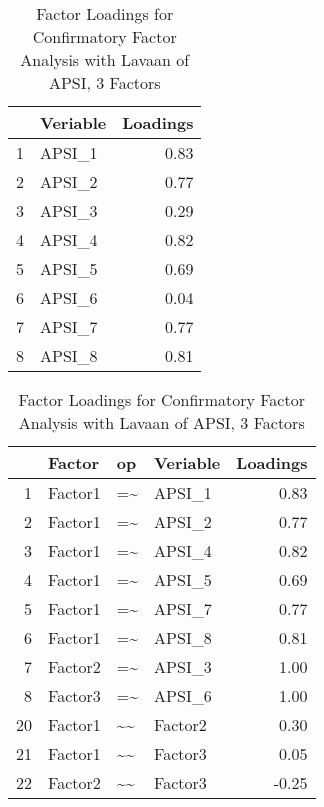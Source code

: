 \documentclass{article}\usepackage[]{graphicx}\usepackage[]{color}
\begin{document}
\begin{table}[ht]
\centering
\begin{tabular}{rlr}
  \hline
 & Veriable & Loadings \\ 
  \hline
1 & APSI\_1 & 0.83 \\ 
  2 & APSI\_2 & 0.77 \\ 
  3 & APSI\_3 & 0.29 \\ 
  4 & APSI\_4 & 0.82 \\ 
  5 & APSI\_5 & 0.69 \\ 
  6 & APSI\_6 & 0.04 \\ 
  7 & APSI\_7 & 0.77 \\ 
  8 & APSI\_8 & 0.81 \\ 
   \hline
\end{tabular}
\caption{Factor Loadings for Confirmatory Factor Analysis with Lavaan of APSI, 3 Factors} 
\end{table}
\begin{table}[ht]
\centering
\begin{tabular}{rlllr}
  \hline
 & Factor & op & Veriable & Loadings \\ 
  \hline
1 & Factor1 & =\~{} & APSI\_1 & 0.83 \\ 
  2 & Factor1 & =\~{} & APSI\_2 & 0.77 \\ 
  3 & Factor1 & =\~{} & APSI\_4 & 0.82 \\ 
  4 & Factor1 & =\~{} & APSI\_5 & 0.69 \\ 
  5 & Factor1 & =\~{} & APSI\_7 & 0.77 \\ 
  6 & Factor1 & =\~{} & APSI\_8 & 0.81 \\ 
  7 & Factor2 & =\~{} & APSI\_3 & 1.00 \\ 
  8 & Factor3 & =\~{} & APSI\_6 & 1.00 \\ 
  20 & Factor1 & \~{}\~{} & Factor2 & 0.30 \\ 
  21 & Factor1 & \~{}\~{} & Factor3 & 0.05 \\ 
  22 & Factor2 & \~{}\~{} & Factor3 & -0.25 \\ 
   \hline
\end{tabular}
\caption{Factor Loadings for Confirmatory Factor Analysis with Lavaan of APSI, 3 Factors} 
\end{table}
\end{document}
